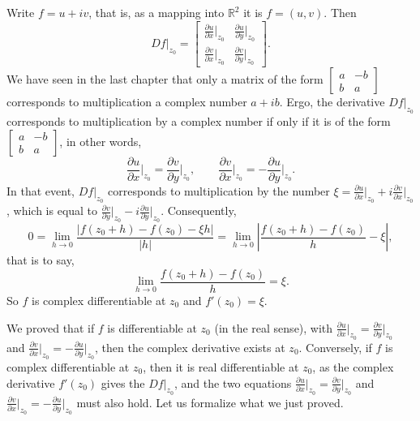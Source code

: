 \documentclass[12pt,openany]{book}
\newcommand{\sabs}[1]{\lvert {#1} \rvert}
\newcommand{\abs}[1]{\left\lvert {#1} \right\rvert}
\newcommand{\R}{{\mathbb{R}}}
\theoremstyle{plain}
\theoremstyle{remark}
\theoremstyle{definition}
\theoremstyle{exercise}
\theoremstyle{example}
\begin{document}
Write $f = u+iv$, that is, as a
mapping into $\R^2$ it is $f = (u,v)$.  Then
\begin{equation*}
Df|_{z_0} =
\begin{bmatrix}
\frac{\partial u}{\partial x}\big|_{z_0} & \frac{\partial u}{\partial
y}\big|_{z_0} \\[5pt]
\frac{\partial v}{\partial x}\big|_{z_0} & \frac{\partial v}{\partial y}\big|_{z_0}
\end{bmatrix} .
\end{equation*}
We have seen in the last chapter that only a matrix of the form
$\left[ \begin{smallmatrix}
a & -b \\ b & a
\end{smallmatrix} \right]$ corresponds to multiplication a complex number $a+ib$.
Ergo, the derivative $Df|_{z_0}$ corresponds to multiplication by a
complex number if only if it is of the form
$\left[ \begin{smallmatrix}
a & -b \\ b & a
\end{smallmatrix} \right]$, in other words,
\begin{equation*}
\frac{\partial u}{\partial x}\Big|_{z_0} =
\frac{\partial v}{\partial y}\Big|_{z_0}
, \qquad
\frac{\partial v}{\partial x}\Big|_{z_0} =
-\frac{\partial u}{\partial y}\Big|_{z_0} .
\end{equation*}
In that event, $Df|_{z_0}$ corresponds to multiplication by the number
$\xi = \frac{\partial u}{\partial x}\big|_{z_0} + i \frac{\partial v}{\partial
x}\big|_{z_0}$, which is equal to
$\frac{\partial v}{\partial y}\big|_{z_0} - i \frac{\partial u}{\partial
y}\big|_{z_0}$.
Consequently,
\begin{equation*}
0 = \lim_{h \to 0} \frac{\sabs{f(z_0+h) - f(z_0) - \xi h}}{\sabs{h}} =
\lim_{h \to 0} \abs{\frac{f(z_0+h) - f(z_0)}{h} - \xi} ,
\end{equation*}
that is to say,
\begin{equation*}
\lim_{h \to 0} \frac{f(z_0+h) - f(z_0)}{h} = \xi .
\end{equation*}
So $f$ is complex differentiable at $z_0$ and $f'(z_0) = \xi$.

We proved that if $f$ is differentiable at $z_0$ (in the real sense),
with
$\frac{\partial u}{\partial x}\big|_{z_0} = \frac{\partial v}{\partial
y}\big|_{z_0}$ and $\frac{\partial v}{\partial x}\big|_{z_0} = -\frac{\partial
u}{\partial y}\big|_{z_0}$, then
the complex derivative exists at $z_0$.
Conversely,
if $f$ is complex differentiable at $z_0$, then it is real
differentiable at $z_0$,
as the complex derivative $f'(z_0)$ gives the $Df|_{z_0}$, and the two
equations 
$\frac{\partial u}{\partial x}\big|_{z_0} = \frac{\partial v}{\partial
y}\big|_{z_0}$ and $\frac{\partial v}{\partial x}\big|_{z_0} = -\frac{\partial
u}{\partial y}\big|_{z_0}$
must also hold.
Let us formalize
what we just proved.
\end{document}

